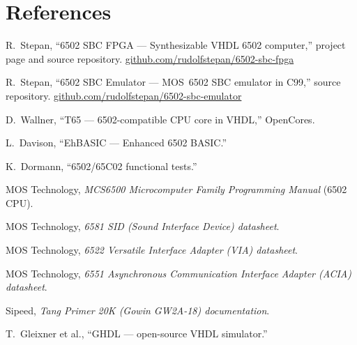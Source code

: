 \documentclass[11pt,a4paper]{article}
\begin{document}
\section*{References}
\small
\begin{enumerate}[label={[\arabic*]},leftmargin=2.2em,itemsep=0.2em]
  \item R.~Stepan, ``6502 SBC FPGA --- Synthesizable VHDL 6502 computer,'' project page and source repository. \href{https://github.com/rudolfstepan/6502-sbc-fpga}{github.com/rudolfstepan/6502-sbc-fpga}
  \item R.~Stepan, ``6502 SBC Emulator --- MOS~6502 SBC emulator in C99,'' source repository. \href{https://github.com/rudolfstepan/6502-sbc-emulator}{github.com/rudolfstepan/6502-sbc-emulator}
  \item D.~Wallner, ``T65 --- 6502-compatible CPU core in VHDL,'' OpenCores.
  \item L.~Davison, ``EhBASIC --- Enhanced 6502 BASIC.''
  \item K.~Dormann, ``6502/65C02 functional tests.''
  \item MOS Technology, \textit{MCS6500 Microcomputer Family Programming Manual} (6502 CPU).
  \item MOS Technology, \textit{6581 SID (Sound Interface Device) datasheet}.
  \item MOS Technology, \textit{6522 Versatile Interface Adapter (VIA) datasheet}.
  \item MOS Technology, \textit{6551 Asynchronous Communication Interface Adapter (ACIA) datasheet}.
  \item Sipeed, \textit{Tang Primer 20K (Gowin GW2A-18) documentation}.
  \item T.~Gleixner et al., ``GHDL --- open-source VHDL simulator.''
\end{enumerate}
\end{document}

